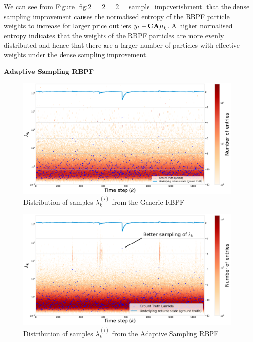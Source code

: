 \documentclass[../main.tex]{subfiles}
\begin{document}
We can see from Figure \ref{fig:2__2__2__sample_impoverishment} that the dense sampling improvement causes the normalised entropy of the RBPF particle weights to increase for larger price outliers $y_t - {\bf CA\mu}_k$. A higher normalised entropy indicates that the weights of the RBPF particles are more evenly distributed and hence that there are a larger number of particles with effective weights under the dense sampling improvement.
	
\textbf{Adaptive Sampling RBPF}

\begin{figure}[h!]
	\centering
	\includegraphics[width=15.0cm]{../plots/4__1__1__lambdas_generic.png}
	\caption{Distribution of samples $\lambda_k^{(i)}$ from the Generic RBPF}
	\label{fig:4__1__1__lambdas_generic}
\end{figure}

\begin{figure}[h!]
	\centering
	\includegraphics[width=15.0cm]{../plots/4__1__1__lambdas_adaptive_sampling.png}
	\caption{Distribution of samples $\lambda_k^{(i)}$ from the Adaptive Sampling RBPF}
	\label{fig:4__1__1__lambdas_adaptive_sampling}
\end{figure}
\end{document}
